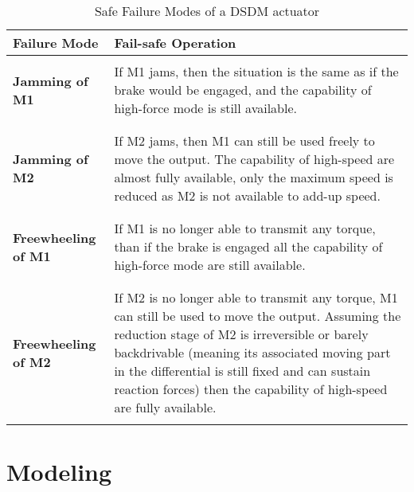 \begin{table}[h]
	\centering
	\caption{Safe Failure Modes of a DSDM actuator}
	\vspace{+5pt}
		\begin{tabular}{| p{1.8in} | p{4.2in} |}
		\hline \hline
		\textbf{Failure Mode} & \textbf{Fail-safe Operation} \\	\hline \hline & \\
		\textbf{Jamming of M1} &
				If M1 jams, then the situation is the same as if the brake would be engaged, and the capability of high-force mode is still available. \\  & \\ \hline & \\
				\textbf{Jamming of M2} &
				If M2 jams, then M1 can still be used freely to move the output. The capability of high-speed are almost fully available, only the maximum speed is reduced as M2 is not available to add-up speed. \\ & \\ \hline & \\  
				\textbf{Freewheeling of M1} & 
				If M1 is no longer able to transmit any torque, than if the brake is engaged all the capability of high-force mode are still available. \\ & \\ \hline & \\
				\textbf{Freewheeling of M2} & 
				If M2 is no longer able to transmit any torque, M1 can still be used to move the output. Assuming the reduction stage of M2 is irreversible or barely backdrivable (meaning its associated moving part in the differential is still fixed and can sustain reaction forces) then the capability of high-speed are fully available.			\\	& \\ \hline \hline
		\end{tabular}
	\label{tab:FailureModesOfADSDMActuator}
\end{table}



\newpage

\section{Modeling}
\label{sec:mod}

